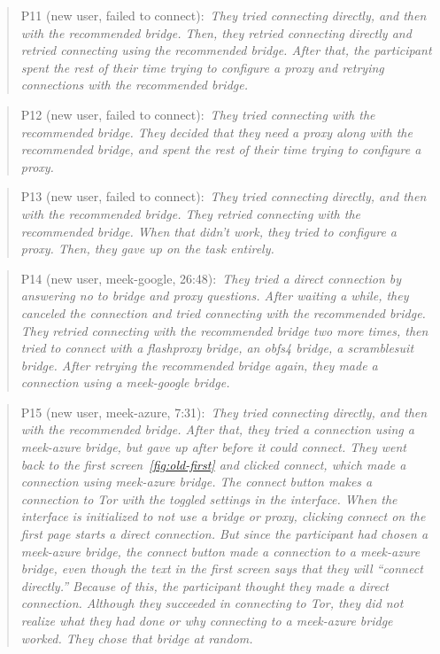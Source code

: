 \documentclass[USenglish,oneside,twocolumn]{article}
\newcommand{\pquote}[2]{
\begin{quotation}
\noindent #1:~\textit{#2}
\end{quotation}
}
\begin{document}
\pquote{P11 (new user, failed to connect)}{They tried connecting directly, and then with the recommended bridge. Then, they retried connecting directly and retried connecting using the recommended bridge. After that, the participant spent the rest of their time trying to configure a proxy and retrying connections with the recommended bridge.}

\pquote{P12 (new user, failed to connect)}{They tried connecting with the recommended bridge. They decided that they need a proxy along with the recommended bridge, and spent the rest of their time trying to configure a proxy.}

\pquote{P13 (new user, failed to connect)}{They tried connecting directly, and then with the recommended bridge. They retried connecting with the recommended bridge. When that didn't work, they tried to configure a proxy. Then, they gave up on the task entirely.}

\pquote{P14 (new user, meek-google, 26:48)}{They tried a direct connection by answering no to bridge and proxy questions. After waiting a while, they canceled the connection and tried connecting with the recommended bridge. They retried connecting with the recommended bridge two more times, then tried to connect with a flashproxy bridge, an obfs4 bridge, a scramblesuit bridge. After retrying the recommended bridge again, they made a connection using a meek-google bridge.}

\pquote{P15 (new user, meek-azure, 7:31)}{They tried connecting directly, and then with the recommended bridge. After that, they tried a connection using a meek-azure bridge, but gave up after before it could connect. They went back to the first screen~\ref{fig:old-first} and clicked connect, which made a connection using meek-azure bridge. The connect button makes a connection to Tor with the toggled settings in the interface. When the interface is initialized to not use a bridge or proxy, clicking connect on the first page starts a direct connection. But since the participant had chosen a meek-azure bridge, the connect button made a connection to a meek-azure bridge, even though the text in the first screen says that they will ``connect directly.'' Because of this, the participant thought they made a direct connection. Although they succeeded in connecting to Tor, they did not realize what they had done or why connecting to a meek-azure bridge worked. They chose that bridge at random.}
\end{document}
